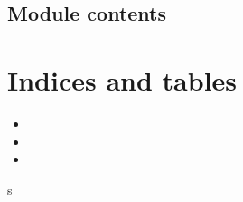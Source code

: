 \documentclass[letterpaper,10pt,english]{sphinxmanual}
\begin{document}
\section{Module contents}
\label{\detokenize{src:module-src}}\label{\detokenize{src:module-contents}}

\chapter{Indices and tables}
\label{\detokenize{index:indices-and-tables}}\begin{itemize}
\item {} 

\item {} 

\item {} 

\end{itemize}


\renewcommand{\indexname}{Python Module Index}
\begin{sphinxtheindex}
\def\bigletter#1{{\Large\sffamily#1}\nopagebreak\vspace{1mm}}
\bigletter{s}
\item {}
\item {}
\end{sphinxtheindex}

\renewcommand{\indexname}{Index}
\printindex
\end{document}
